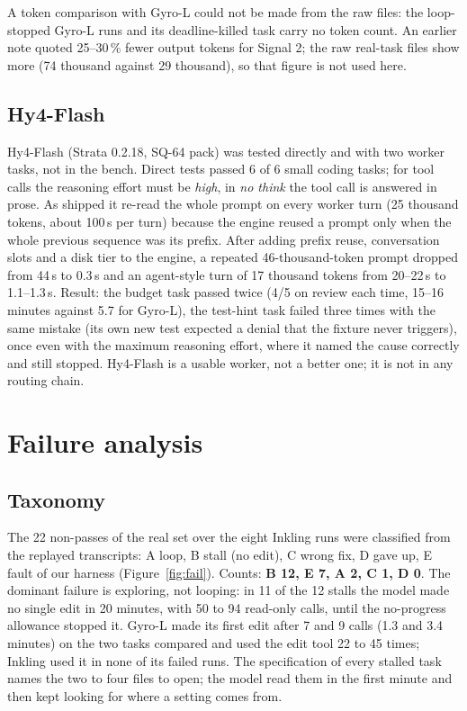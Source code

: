 A token comparison with Gyro-L could not be made from the raw files: the loop-stopped Gyro-L runs and its
deadline-killed task carry no token count. An earlier note quoted 25--30\,\% fewer output tokens for Signal 2; the
raw real-task files show more (74 thousand against 29 thousand), so that figure is not used here.

\subsection{Hy4-Flash}

Hy4-Flash (Strata 0.2.18, SQ-64 pack) was tested directly and with two worker tasks, not in the bench. Direct tests
passed 6 of 6 small coding tasks; for tool calls the reasoning effort must be \emph{high}, in \emph{no think} the
tool call is answered in prose. As shipped it re-read the whole prompt on every worker turn (25 thousand tokens, about
100\,s per turn) because the engine reused a prompt only when the whole previous sequence was its prefix. After
adding prefix reuse, conversation slots and a disk tier to the engine, a repeated 46-thousand-token prompt dropped from
44\,s to 0.3\,s and an agent-style turn of 17 thousand tokens from 20--22\,s to 1.1--1.3\,s. Result: the budget task
passed twice (4/5 on review each time, 15--16 minutes against 5.7 for Gyro-L), the test-hint task failed three
times with the same mistake (its own new test expected a denial that the fixture never triggers), once even with the
maximum reasoning effort, where it named the cause correctly and still stopped. Hy4-Flash is a usable worker, not a
better one; it is not in any routing chain.

\section{Failure analysis}\label{sec:failures}

\subsection{Taxonomy}

The 22 non-passes of the real set over the eight Inkling runs were classified from the replayed transcripts:
A loop, B stall (no edit), C wrong fix, D gave up, E fault of our harness (Figure~\ref{fig:fail}). Counts:
\textbf{B 12, E 7, A 2, C 1, D 0}. The dominant failure is exploring, not looping: in 11 of the 12 stalls the model made no
single edit in 20 minutes, with 50 to 94 read-only calls, until the no-progress allowance stopped it. Gyro-L made its
first edit after 7 and 9 calls (1.3 and 3.4 minutes) on the two tasks compared and used the edit tool 22 to 45 times; Inkling used it
in none of its failed runs. The specification of every stalled task names the two to four files to open; the model
read them in the first minute and then kept looking for where a setting comes from.

